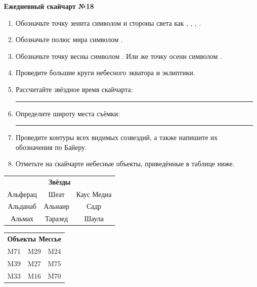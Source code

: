 \documentclass{./SAS-class-skygen}
\begin{document}
    
    
    
	\begin{center}
		\large\textbf{Ежедневный скайчарт №18}
	\end{center}

	\begin{enumerate}
		\item Обозначьте точку зенита символом  и стороны света как , , , .
		\item Обозначьте полюс мира символом .
		\item Обозначьте точку весны символом \Aries. Или же точку осени символом \Libra.
		\item Проведите большие круги небесного экватора и эклиптики.
		\item Рассчитайте звёздное время скайчарта: \rule{2cm}{0.4pt}
		\item Определите широту места съёмки: \rule{2cm}{0.4pt}
		\item Проведите контуры всех видимых созвездий, а также напишите их обозначения по Байеру.
		\item Отметьте на скайчарте небесные объекты, приведённые в таблице ниже.
	\end{enumerate}
	
    \vspace{0.5cm}

    \begin{table}[h!]
    \centering
    \begin{tabular}{ccc}
    \multicolumn{3}{c}{\textbf{Звёзды}} \\ Альферац & Шеат & Каус Медиа \\
Альданаб & Альнаир & Садр \\
Альмах & Таразед & Шаула \\

\end{tabular}
    \hfill
    \begin{tabular}{ccc}
    \multicolumn{3}{c}{\textbf{Объекты Мессье}} \\ M71 & M29 & M24 \\
M39 & M27 & M75 \\
M33 & M16 & M70 \\

\end{tabular}
    \end{table}
	
\end{document}
